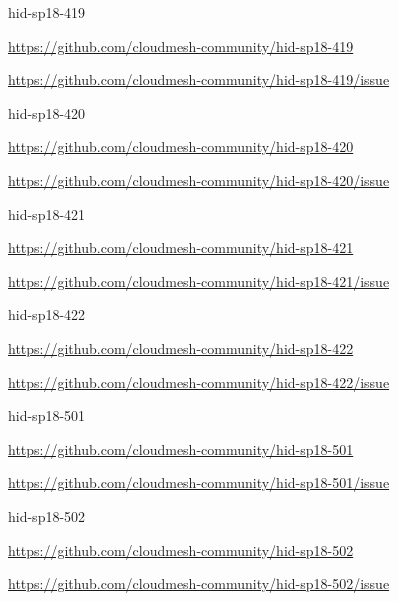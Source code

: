 \begin{IU}

hid-sp18-419

\url{https://github.com/cloudmesh-community/hid-sp18-419}

\url{https://github.com/cloudmesh-community/hid-sp18-419/issue}

\end{IU}


\begin{IU}

hid-sp18-420

\url{https://github.com/cloudmesh-community/hid-sp18-420}

\url{https://github.com/cloudmesh-community/hid-sp18-420/issue}

\end{IU}


\begin{IU}

hid-sp18-421

\url{https://github.com/cloudmesh-community/hid-sp18-421}

\url{https://github.com/cloudmesh-community/hid-sp18-421/issue}

\end{IU}


\begin{IU}

hid-sp18-422

\url{https://github.com/cloudmesh-community/hid-sp18-422}

\url{https://github.com/cloudmesh-community/hid-sp18-422/issue}

\end{IU}


\begin{IU}

hid-sp18-501

\url{https://github.com/cloudmesh-community/hid-sp18-501}

\url{https://github.com/cloudmesh-community/hid-sp18-501/issue}

\end{IU}


\begin{IU}

hid-sp18-502

\url{https://github.com/cloudmesh-community/hid-sp18-502}

\url{https://github.com/cloudmesh-community/hid-sp18-502/issue}

\end{IU}


